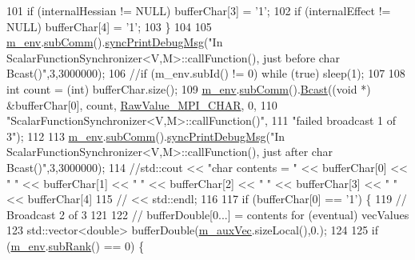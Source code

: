 \begin{DoxyCode}
101         \textcolor{keywordflow}{if} (internalHessian   != NULL) bufferChar[3] = \textcolor{charliteral}{'1'};
102         \textcolor{keywordflow}{if} (internalEffect    != NULL) bufferChar[4] = \textcolor{charliteral}{'1'};
103       \}
104 
105       \hyperlink{class_q_u_e_s_o_1_1_scalar_function_synchronizer_aa77a3d3b53267ef7c731836faaa082fb}{m\_env}.\hyperlink{class_q_u_e_s_o_1_1_base_environment_affe39f53e3d5d678842413370af09145}{subComm}().\hyperlink{class_q_u_e_s_o_1_1_mpi_comm_a6f73891de4668c325277ddaa799cf808}{syncPrintDebugMsg}(\textcolor{stringliteral}{"In
       ScalarFunctionSynchronizer<V,M>::callFunction(), just before char Bcast()"},3,3000000);
106       \textcolor{comment}{//if (m\_env.subId() != 0) while (true) sleep(1);}
107 
108       \textcolor{keywordtype}{int} count = (int) bufferChar.size();
109       \hyperlink{class_q_u_e_s_o_1_1_scalar_function_synchronizer_aa77a3d3b53267ef7c731836faaa082fb}{m\_env}.\hyperlink{class_q_u_e_s_o_1_1_base_environment_affe39f53e3d5d678842413370af09145}{subComm}().\hyperlink{class_q_u_e_s_o_1_1_mpi_comm_abd6af8db8b0c7fd2f5b62e26477a9537}{Bcast}((\textcolor{keywordtype}{void} *) &bufferChar[0], count, 
      \hyperlink{_mpi_comm_8h_ae81a57f3cac29c0f9c656182d95b8af1}{RawValue\_MPI\_CHAR}, 0,
110                             \textcolor{stringliteral}{"ScalarFunctionSynchronizer<V,M>::callFunction()"},
111                             \textcolor{stringliteral}{"failed broadcast 1 of 3"});
112 
113       \hyperlink{class_q_u_e_s_o_1_1_scalar_function_synchronizer_aa77a3d3b53267ef7c731836faaa082fb}{m\_env}.\hyperlink{class_q_u_e_s_o_1_1_base_environment_affe39f53e3d5d678842413370af09145}{subComm}().\hyperlink{class_q_u_e_s_o_1_1_mpi_comm_a6f73891de4668c325277ddaa799cf808}{syncPrintDebugMsg}(\textcolor{stringliteral}{"In
       ScalarFunctionSynchronizer<V,M>::callFunction(), just after char Bcast()"},3,3000000);
114       \textcolor{comment}{//std::cout << "char contents = " << bufferChar[0] << " " << bufferChar[1] << " " << bufferChar[2] <<
       " " << bufferChar[3] << " " << bufferChar[4]}
115       \textcolor{comment}{//          << std::endl;}
116 
117       \textcolor{keywordflow}{if} (bufferChar[0] == \textcolor{charliteral}{'1'}) \{
119         \textcolor{comment}{// Broadcast 2 of 3}
121 \textcolor{comment}{}
122         \textcolor{comment}{// bufferDouble[0...] = contents for (eventual) vecValues}
123         std::vector<double> bufferDouble(\hyperlink{class_q_u_e_s_o_1_1_scalar_function_synchronizer_adbd43aee6de557012924f3e18660a4f3}{m\_auxVec}.sizeLocal(),0.);
124 
125         \textcolor{keywordflow}{if} (\hyperlink{class_q_u_e_s_o_1_1_scalar_function_synchronizer_aa77a3d3b53267ef7c731836faaa082fb}{m\_env}.\hyperlink{class_q_u_e_s_o_1_1_base_environment_a172d52f993f1322ed45aaddf71518dbb}{subRank}() == 0) \{

\end{DoxyCode}

